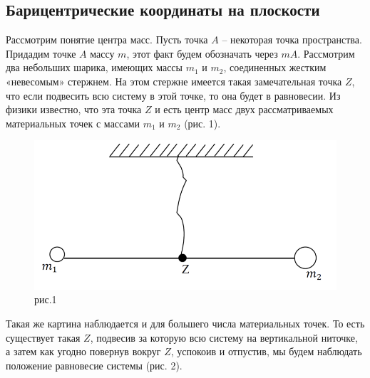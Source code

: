 \documentclass[a4paper,12pt]{article}
\theoremstyle{plain} %
\numberwithin{equation}{section}
\theoremstyle{definition} %
\theoremstyle{remark} %
\begin{document}
\subsection{Барицентрические координаты на плоскости}
Рассмотрим понятие центра масс. Пусть точка $A$ – некоторая точка пространства. Придадим точке $A$ массу $m$, этот факт будем обозначать через $mA$. 
Рассмотрим два небольших шарика, имеющих массы $m_1$ и $m_2$, соединенных жестким «невесомым» стержнем. На этом стержне имеется такая замечательная точка $Z$, что если подвесить всю систему в этой точке, то она будет в равновесии. Из физики известно, что эта точка $Z$ и есть центр масс двух рассматриваемых материальных точек с массами $m_1$ и $m_2$ (рис. 1).
\begin{figure}
\centering\includegraphics[scale=0.9]{img/центр замечательной точки.png}
\caption{рис.1}
\end{figure}
Такая же картина наблюдается и для большего числа материальных точек. То есть существует такая $Z$, подвесив за которую всю систему на вертикальной ниточке, а затем как угодно повернув вокруг $Z$, успокоив и отпустив, мы будем наблюдать положение равновесие системы (рис. 2).
\end{document}
